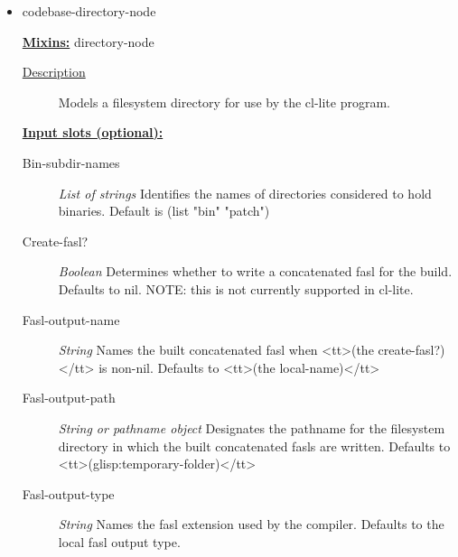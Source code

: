 \documentclass [11pt]{book}
\begin{document}
\begin{itemize}

\item {}codebase-directory-node


\textbf{
\underline{Mixins:}} directory-node





\begin{description}

\item [
\underline{Description}]


Models a filesystem directory for use by the cl-lite program.



\end{description}








\textbf{
\underline{Input slots (optional):}}

\begin{description}

\item [Bin-subdir-names]
\emph{List of strings} Identifies the names of directories considered to hold binaries.
Default is (list "bin" "patch")


\item [Create-fasl?]
\emph{Boolean} Determines whether to write a concatenated fasl for the build. Defaults to nil.
NOTE: this is not currently supported in cl-lite.


\item [Fasl-output-name]
\emph{String} Names the built concatenated fasl when <tt>(the create-fasl?)</tt> is non-nil.
Defaults to <tt>(the local-name)</tt>


\item [Fasl-output-path]
\emph{String or pathname object} Designates the pathname for the filesystem directory in which
the built concatenated fasls are written. Defaults to <tt>(glisp:temporary-folder)</tt>


\item [Fasl-output-type]
\emph{String} Names the fasl extension used by the compiler. Defaults to the local fasl output type.



\end{description}
\end{itemize}
\end{document}
